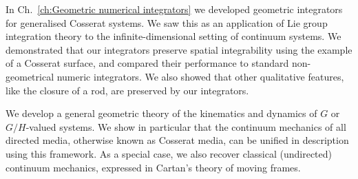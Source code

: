 \documentclass[]{cam-thesis}
\begin{document}
In Ch.~\ref{ch:Geometric numerical integrators} we developed geometric integrators for generalised Cosserat systems. We saw this as an application of Lie group integration theory to the infinite-dimensional setting of continuum systems. We demonstrated that our integrators preserve spatial integrability using the example of a Cosserat surface, and compared their performance to standard non-geometrical numeric integrators. We also showed that other qualitative features, like the closure of a rod, are preserved by our integrators.


















We develop a general geometric theory of the kinematics and dynamics of $G$ or $G/H$-valued systems. We show in particular that the continuum mechanics of all directed media, otherwise known as Cosserat media, can be unified in description using this framework. As a special case, we also recover classical (undirected) continuum mechanics, expressed in Cartan's theory of moving frames.
\end{document}
